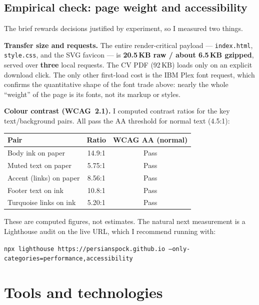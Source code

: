 \documentclass[11pt,a4paper]{article}
\begin{document}
\subsection{Empirical check: page weight and accessibility}
The brief rewards decisions justified by experiment, so I measured two things.

\textbf{Transfer size and requests.} The entire render-critical payload ---
\texttt{index.html}, \texttt{style.css}, and the SVG favicon --- is
\textbf{20.5\,KB raw / about 6.5\,KB gzipped}, served over \textbf{three} local
requests. The CV PDF (92\,KB) loads only on an explicit download click. The only
other first-load cost is the IBM Plex font request, which confirms the
quantitative shape of the font trade above: nearly the whole ``weight'' of the
page is its fonts, not its markup or styles.

\textbf{Colour contrast (WCAG~2.1).} I computed contrast ratios for the key
text/background pairs. All pass the AA threshold for normal text (4.5:1):

\begin{center}\small
\begin{tabular}{lcc}
\toprule
Pair & Ratio & WCAG AA (normal) \\
\midrule
Body ink on paper        & 14.9:1 & Pass \\
Muted text on paper      & 5.75:1 & Pass \\
Accent (links) on paper  & 8.56:1 & Pass \\
Footer text on ink       & 10.8:1 & Pass \\
Turquoise links on ink   & 5.20:1 & Pass \\
\bottomrule
\end{tabular}
\end{center}

These are computed figures, not estimates. The natural next measurement is a
Lighthouse audit on the live URL, which I recommend running with:

{\small\texttt{npx lighthouse https://persianspock.github.io --only-categories=performance,accessibility}}

\section{Tools and technologies}
\end{document}
